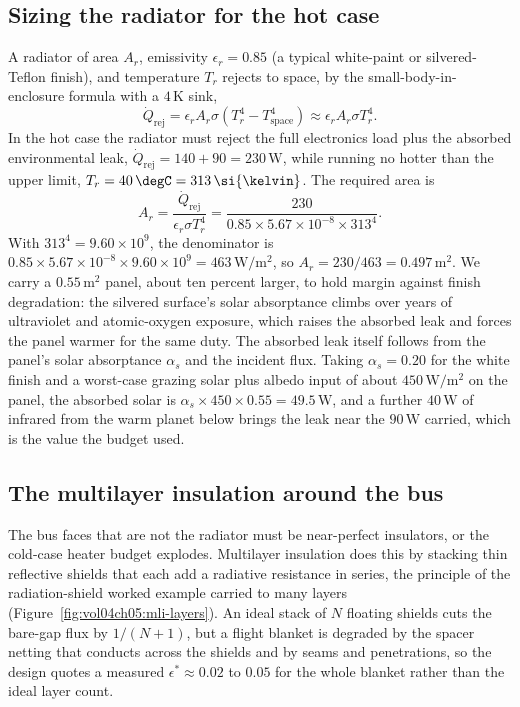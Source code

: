 

\subsection{Sizing the radiator for the hot case}

A radiator of area $A_r$, emissivity $\epsilon_r = 0.85$ (a typical
white-paint or silvered-Teflon finish), and temperature $T_r$ rejects to
space, by the small-body-in-enclosure formula with a $4\,\si{\kelvin}$
sink,
\[
\dot{Q}_{\text{rej}} = \epsilon_r A_r \sigma (T_r^4 - T_{\text{space}}^4)
\approx \epsilon_r A_r \sigma T_r^4.
\]
In the hot case the radiator must reject the full electronics load plus
the absorbed environmental leak, $\dot{Q}_{\text{rej}} = 140 + 90 =
230\,\text{W}$, while running no hotter than the upper limit, $T_r =
40\,\degC = 313\,\si{\kelvin}$. The required area is
\[
A_r = \frac{\dot{Q}_{\text{rej}}}{\epsilon_r \sigma T_r^4} =
\frac{230}{0.85 \times 5.67 \times 10^{-8} \times 313^4}.
\]
With $313^4 = 9.60 \times 10^9$, the denominator is $0.85 \times 5.67
\times 10^{-8} \times 9.60 \times 10^9 = 463\,\text{W}/\text{m}^2$, so
$A_r = 230/463 = 0.497\,\text{m}^2$. We carry a $0.55\,\text{m}^2$ panel,
about ten percent larger, to hold margin against finish degradation: the
silvered surface's solar absorptance climbs over years of ultraviolet and
atomic-oxygen exposure, which raises the absorbed leak and forces the
panel warmer for the same duty. The absorbed leak itself follows from the
panel's solar absorptance $\alpha_s$ and the incident flux. Taking
$\alpha_s = 0.20$ for the white finish and a worst-case grazing solar plus
albedo input of about $450\,\text{W}/\text{m}^2$ on the panel, the
absorbed solar is $\alpha_s \times 450 \times 0.55 = 49.5\,\text{W}$, and
a further $40\,\text{W}$ of infrared from the warm planet below brings the
leak near the $90\,\text{W}$ carried, which is the value the budget used.

\subsection{The multilayer insulation around the bus}

The bus faces that are not the radiator must be near-perfect insulators,
or the cold-case heater budget explodes. Multilayer insulation does this
by stacking thin reflective shields that each add a radiative resistance
in series, the principle of the radiation-shield worked example carried to
many layers (Figure~\ref{fig:vol04ch05:mli-layers}). An ideal stack of
$N$ floating shields cuts the bare-gap flux by $1/(N+1)$, but a flight
blanket is degraded by the spacer netting that conducts across the shields
and by seams and penetrations, so the design quotes a measured
 $\epsilon^* \approx 0.02$ to $0.05$ for the
whole blanket rather than the ideal layer count.


